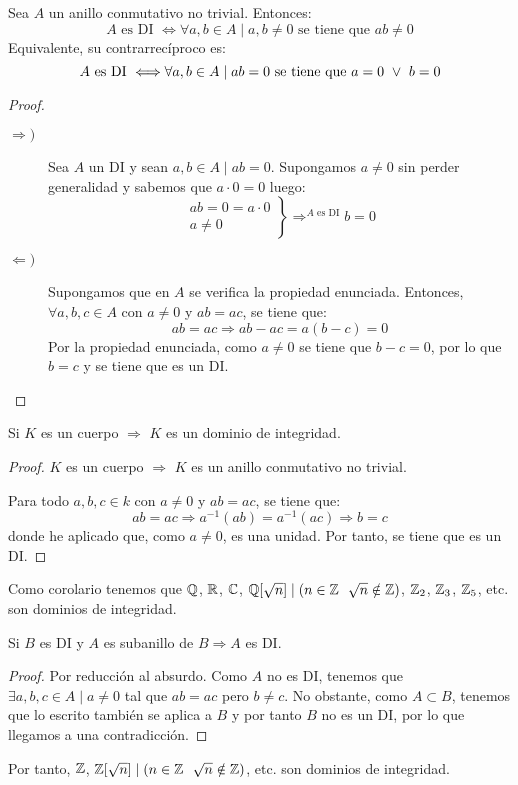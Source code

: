 \begin{prop}[Caracterización de un DI]
    Sea $A$ un anillo conmutativo no trivial. Entonces:
    $$A \mbox{ es DI } \Longleftrightarrow \forall a,b \in A \mid a,b \neq 0 \text{ se tiene que } ab \neq 0$$
    Equivalente, su contrarrecíproco es:
    $$A \mbox{ es DI } \Longleftrightarrow \forall a,b \in A \mid ab = 0 \text{ se tiene que } a = 0 \ \lor \  b = 0$$
\end{prop}
\begin{proof}\
    \begin{description}
        \item[$\Longrightarrow)$]
        Sea $A$ un DI y sean $a,b \in A \mid ab = 0$. Supongamos $a\neq 0$ sin perder generalidad y sabemos que $a \cdot 0 = 0$ luego:
        $$\left. \begin{array}{c}
            ab = 0 = a \cdot 0 \\
            a \neq 0
        \end{array} \right\} \mathop{\Longrightarrow}^{A \mbox{ es DI}} b=0$$
            
        \item[$\Longleftarrow)$]
        Supongamos que en $A$ se verifica la propiedad enunciada. Entonces, $\forall a,b,c \in A$ con $a\neq 0$ y $ab=ac$, se tiene que:
        $$ ab = ac \Longrightarrow ab - ac = a(b - c) = 0$$
        Por la propiedad enunciada, como $a\neq 0$ se tiene que $b-c=0$, por lo que $b=c$ y se tiene que es un DI.
    \end{description}
\end{proof}

\begin{lema}
    \label{lema:CuerpoEntoncesDominio}
    Si $K$ es un cuerpo $\Longrightarrow$ $K$ es un dominio de integridad.
\end{lema}
\begin{proof}
    $K$ es un cuerpo $\Longrightarrow$ $K$ es un anillo conmutativo no trivial.

    Para todo $a,b,c \in k$ con $a\neq 0$ y $ab=ac$, se tiene que:
    $$ab=ac \Longrightarrow a^{-1}(ab) = a^{-1}(ac) \Longrightarrow b=c$$
    donde he aplicado que, como $a\neq 0$, es una unidad. Por tanto, se tiene que es un DI.
\end{proof}


Como corolario tenemos que $\mathbb Q$, $\mathbb R$, $\mathbb C$, $\mathbb Q[\sqrt{n}] \mid (n \in \mathbb Z~~\sqrt{n} \notin \mathbb Z)$, $\mathbb Z_2$, $\mathbb Z_3$, $\mathbb Z_5$, etc. son dominios de integridad.

\begin{lema}
    \label{lema:SubanilloDIEntoncesDI}
    Si $B$ es DI y $A$ es subanillo de $B \Longrightarrow A$ es DI.
\end{lema}
\begin{proof}
    Por reducción al absurdo. Como $A$ no es DI, tenemos que $\exists a,b,c \in A \mid a \neq 0$ tal que $ab=ac $ pero $b \neq c$.
    No obstante, como $A\subset B$, tenemos que lo escrito también se aplica a $B$ y por tanto $B$ no es un DI, por lo que llegamos a una contradicción.
\end{proof}
Por tanto, $\mathbb Z$, $\mathbb Z[\sqrt{n}] \mid (n \in \mathbb Z~~\sqrt{n} \notin \mathbb Z)$, etc. son dominios de integridad.

